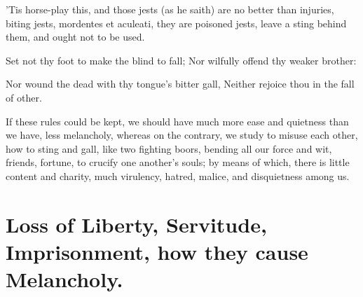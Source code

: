 {'Tis horse-play this, and those jests (as he saith) are no better
than injuries, biting jests, mordentes et aculeati, they are poisoned
jests, leave a sting behind them, and ought not to be used.

Set not thy foot to make the blind to fall;
Nor wilfully offend thy weaker brother:

Nor wound the dead with thy tongue's bitter gall,
Neither rejoice thou in the fall of other.

If these rules could be kept, we should have much more ease and
quietness than we have, less melancholy, whereas on the contrary, we
study to misuse each other, how to sting and gall, like two fighting
boors, bending all our force and wit, friends, fortune, to crucify
one another's souls; by means of which, there is little content
and charity, much virulency, hatred, malice, and disquietness among us.

\section[Loss of Liberty, Servitude]{Loss of Liberty, Servitude, Imprisonment, how they cause Melancholy.}

}
